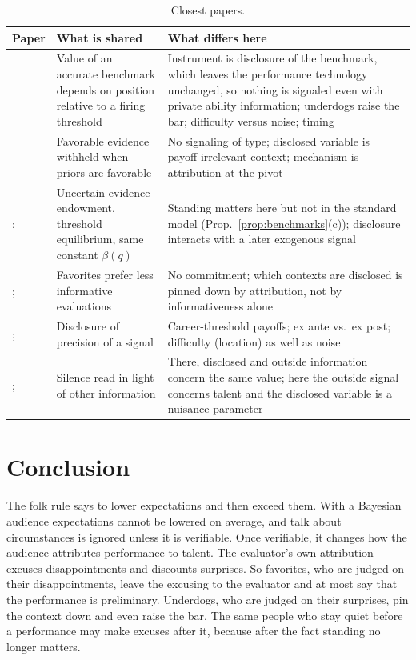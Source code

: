 \documentclass[11pt]{article}
\theoremstyle{definition}
\begin{document}
\begin{table}[t]
\centering
\small
\begin{tabularx}{\textwidth}{@{}>{\raggedright\arraybackslash}p{3.3cm}>{\raggedright\arraybackslash}X>{\raggedright\arraybackslash}X@{}}
\toprule
Paper & What is shared & What differs here \\
\midrule
\citet{Zwiebel1995} & Value of an accurate benchmark depends on position relative to a firing threshold & Instrument is disclosure of the benchmark, which leaves the performance technology unchanged, so nothing is signaled even with private ability information; underdogs raise the bar; difficulty versus noise; timing \\
\citet{HarbaughTo2020} & Favorable evidence withheld when priors are favorable & No signaling of type; disclosed variable is payoff-irrelevant context; mechanism is attribution at the pivot \\
\citet{Dye1985}; \citet{JungKwon1988} & Uncertain evidence endowment, threshold equilibrium, same constant $\beta(q)$ & Standing matters here but not in the standard model (Prop.~\ref{prop:benchmarks}(c)); disclosure interacts with a later exogenous signal \\
\citet{KamenicaGentzkow2011}; \citet{Hermalin1993} & Favorites prefer less informative evaluations & No commitment; which contexts are disclosed is pinned down by attribution, not by informativeness alone \\
\citet{HughesPae2004}; \citet{KimPae2025} & Disclosure of precision of a signal & Career-threshold payoffs; ex ante vs.\ ex post; difficulty (location) as well as noise \\
\citet{LibgoberMichaeliWiedman2023}; \citet{FrenkelGuttmanKremer2020} & Silence read in light of other information & There, disclosed and outside information concern the same value; here the outside signal concerns talent and the disclosed variable is a nuisance parameter \\
\bottomrule
\end{tabularx}
\caption{Closest papers.}
\label{tab:lit}
\end{table}

\section{Conclusion}

The folk rule says to lower expectations and then exceed them. With a Bayesian audience expectations cannot be lowered on average, and talk about circumstances is ignored unless it is verifiable. Once verifiable, it changes how the audience attributes performance to talent. The evaluator's own attribution excuses disappointments and discounts surprises. So favorites, who are judged on their disappointments, leave the excusing to the evaluator and at most say that the performance is preliminary. Underdogs, who are judged on their surprises, pin the context down and even raise the bar. The same people who stay quiet before a performance may make excuses after it, because after the fact standing no longer matters.
\end{document}
